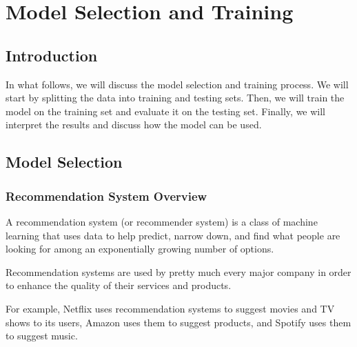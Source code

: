 \chapter{Model Selection and Training}
\minitoc
\newpage

\setcounter{secnumdepth}{0} %
\section{Introduction}
In what follows, we will discuss the model selection and training process.
We will start by splitting the data into training and testing sets.
Then, we will train the model on the training set and evaluate it on the testing set.
Finally, we will interpret the results and discuss how the model can be used.

\setcounter{secnumdepth}{2} %
\section{Model Selection}

\subsection{Recommendation System Overview}

\cite{nvidia} A recommendation system (or recommender system) is a class of machine learning that uses data to help predict, narrow down, and find what people are looking for among an exponentially growing number of options.

Recommendation systems are used by pretty much every major company in order to enhance the quality of their services and products.

For example, Netflix uses recommendation systems to suggest movies and TV shows to its users, Amazon uses them to suggest products, and Spotify uses them to suggest music.

